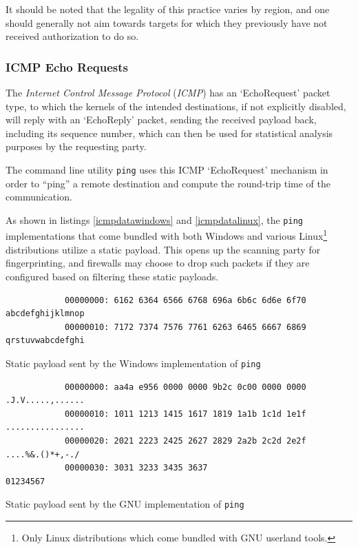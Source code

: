 \documentclass[a4paper,12pt]{article}
\begin{document}
	It should be noted that the legality of this practice varies by region, and one should generally not aim towards targets for which they previously have not received authorization to do so.

\subsubsection{ICMP Echo Requests} \label{icmpping}
 

	The \textit{Internet Control Message Protocol} (\textit{ICMP}) has an `EchoRequest' packet type, to which the kernels of the intended destinations, if not explicitly disabled, will reply with an `EchoReply' packet, sending the received payload back, including its sequence number, which can then be used for statistical analysis purposes by the requesting party.

	The command line utility \texttt{ping} uses this ICMP `EchoRequest' mechanism in order to ``ping'' a remote destination and compute the round-trip time of the communication.
	
	As shown in listings \ref{icmpdatawindows} and \ref{icmpdatalinux}, the \texttt{ping} implementations that come bundled with both Windows and various Linux\footnote{Only Linux distributions which come bundled with GNU userland tools.} distributions utilize a static payload. This opens up the scanning party for fingerprinting, and firewalls may choose to drop such packets if they are configured based on filtering these static payloads.
	
	\begin{listing}[H]
		\begin{verbatim}
			00000000: 6162 6364 6566 6768 696a 6b6c 6d6e 6f70  abcdefghijklmnop
			00000010: 7172 7374 7576 7761 6263 6465 6667 6869  qrstuvwabcdefghi
		\end{verbatim}
		\caption{Static payload sent by the Windows implementation of \texttt{ping}}
		\label{icmpdatawindows}
	\end{listing}
	
	\begin{listing}[H]
		\begin{verbatim}
			00000000: aa4a e956 0000 0000 9b2c 0c00 0000 0000  .J.V.....,......
			00000010: 1011 1213 1415 1617 1819 1a1b 1c1d 1e1f  ................
			00000020: 2021 2223 2425 2627 2829 2a2b 2c2d 2e2f   ....%&.()*+,-./
			00000030: 3031 3233 3435 3637                      01234567
		\end{verbatim}
		\caption{Static payload sent by the GNU implementation of \texttt{ping}}
		\label{icmpdatalinux}
	\end{listing}
	
\end{document}
